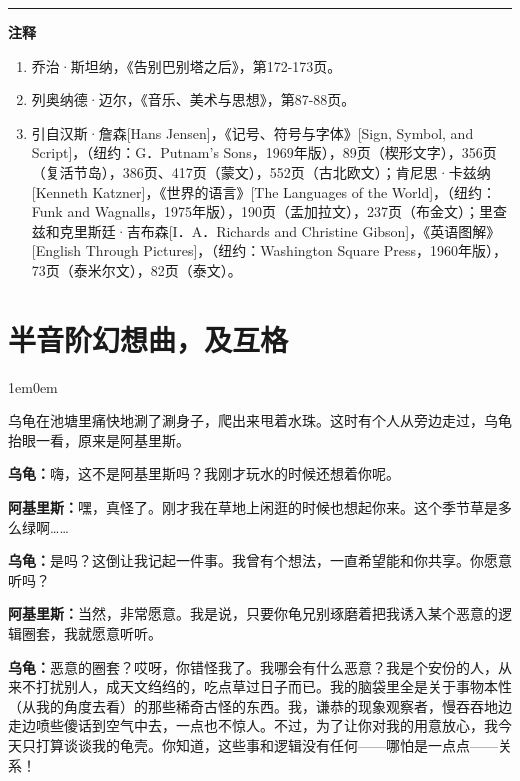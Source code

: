 \documentclass[
  12pt,
  twoside,
  openright,
  oldfontcommands,
]{memoir}
\newcommand{\dialogname}[1]{{\heifamily\bfseries #1}}
\newenvironment{dialogguide}{%
  \begin{adjustwidth}{1em}{0em}\kaitifamily\itshape\small%
}{%
  \end{adjustwidth}%
}
\begin{document}
{\footnotesize\setlength{\parindent}{0pt}%
\noindent\textcolor{rulegray}{\rule{0.35\linewidth}{0.3pt}}\par\vspace{2pt}
\noindent\textbf{注释}\par\vspace{3pt}
\begin{enumerate}
\label{fn:Chapter06-1}{}
\item 乔治·斯坦纳，《告别巴别塔之后》，第172-173页。
\label{fn:Chapter06-2}{}
\item 列奥纳德·迈尔，《音乐、美术与思想》，第87-88页。
\label{fn:Chapter06-3}{}
\item 引自汉斯·詹森[Hans Jensen]，《记号、符号与字体》[Sign, Symbol, and Script]，（纽约：G．Putnam’s Sons，1969年版），89页（楔形文字），356页（复活节岛），386页、417页（蒙文），552页（古北欧文）；肯尼思·卡兹纳[Kenneth Katzner]，《世界的语言》[The Languages of the World]，（纽约：Funk and Wagnalls，1975年版），190页（盂加拉文），237页（布金文）；里查兹和克里斯廷·吉布森[I．A．Richards and Christine Gibson]，《英语图解》[English Through Pictures]，（纽约：Washington Square Press，1960年版），73页（泰米尔文），82页（泰文）。
\end{enumerate}
}

\label{Dialog07.xhtml}{}

\chapter*{半音阶幻想曲，及互格}

\begin{dialogguide}
乌龟在池塘里痛快地涮了涮身子，爬出来甩着水珠。这时有个人从旁边走过，乌龟抬眼一看，原来是阿基里斯。
\end{dialogguide}

\dialogname{乌龟：}嗨，这不是阿基里斯吗？我刚才玩水的时候还想着你呢。

\dialogname{阿基里斯：}嘿，真怪了。刚才我在草地上闲逛的时候也想起你来。这个季节草是多么绿啊\ldots\ldots{}

\dialogname{乌龟：}是吗？这倒让我记起一件事。我曾有个想法，一直希望能和你共享。你愿意听吗？

\dialogname{阿基里斯：}当然，非常愿意。我是说，只要你龟兄别琢磨着把我诱入某个恶意的逻辑圈套，我就愿意听听。

\dialogname{乌龟：}恶意的圈套？哎呀，你错怪我了。我哪会有什么恶意？我是个安份的人，从来不打扰别人，成天文绉绉的，吃点草过日子而已。我的脑袋里全是关于事物本性（从我的角度去看）的那些稀奇古怪的东西。我，谦恭的现象观察者，慢吞吞地边走边喷些傻话到空气中去，一点也不惊人。不过，为了让你对我的用意放心，我今天只打算谈谈我的龟壳。你知道，这些事和逻辑没有任何------哪怕是一点点------关系！
\end{document}
